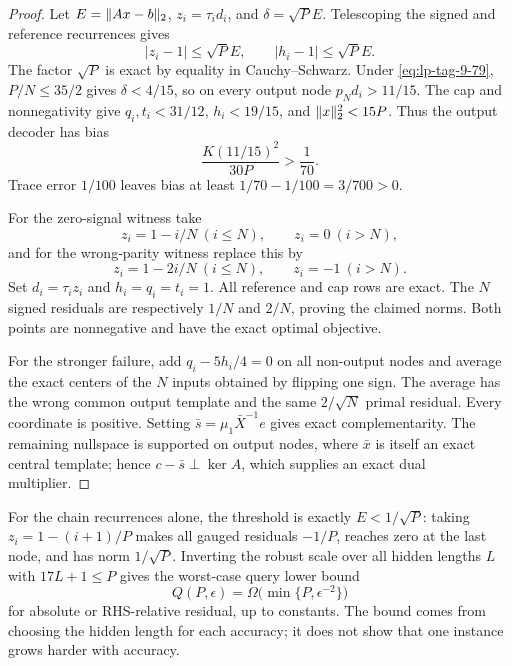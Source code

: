 \begin{proof}
Let \(E=\lVert Ax-b\rVert_2\), \(z_i=\tau_id_i\), and
\(\delta=\sqrt P E\).  Telescoping the signed and reference recurrences gives
\begin{equation}
 |z_i-1|\leq\sqrt P E,\qquad |h_i-1|\leq\sqrt P E.
\end{equation}
The factor \(\sqrt P\) is exact by equality in Cauchy--Schwarz.  Under
\eqref{eq:lp-tag-9-79}, \(P/N\leq35/2\) gives \(\delta<4/15\), so on every output node
\(p_Nd_i>11/15\).  The cap and nonnegativity give
\(q_i,t_i<31/12\), \(h_i<19/15\), and
\(\lVert x\rVert_2^2<15P\).  Thus the output decoder has bias
\begin{equation}
 \frac{K(11/15)^2}{30P}>\frac1{70}.
\end{equation}
Trace error \(1/100\) leaves bias at least
\(1/70-1/100=3/700>0\).

For the zero-signal witness take
\begin{equation}
 z_i=1-i/N\ (i\leq N),\qquad z_i=0\ (i>N),
\end{equation}
and for the wrong-parity witness replace this by
\begin{equation}
 z_i=1-2i/N\ (i\leq N),\qquad z_i=-1\ (i>N).
\end{equation}
Set \(d_i=\tau_i z_i\) and \(h_i=q_i=t_i=1\).  All reference and cap rows
are exact.  The \(N\) signed residuals are respectively \(1/N\) and
\(2/N\), proving the claimed norms.  Both points are nonnegative and have
the exact optimal objective.

For the stronger failure, add \(q_i-5h_i/4=0\) on all non-output nodes and
average the exact centers of the \(N\) inputs obtained by flipping one sign.
The average has the wrong common output template and the same
\(2/\sqrt N\) primal residual.  Every coordinate is positive.  Setting
\(\bar s=\mu_1\bar X^{-1}e\) gives exact complementarity.  The remaining
nullspace is supported on output nodes, where \(\bar x\) is itself an exact
central template; hence \(c-\bar s\perp\ker A\), which supplies an exact
dual multiplier.
\end{proof}

For the chain recurrences alone, the threshold is exactly
\(E<1/\sqrt P\): taking
\(z_i=1-(i+1)/P\) makes all gauged residuals \(-1/P\), reaches zero at the
last node, and has norm \(1/\sqrt P\).  Inverting the robust scale over all
hidden lengths \(L\) with \(17L+1\leq P\) gives the worst-case query lower
bound
\begin{equation}
 Q(P,\epsilon)=\Omega\bigl(\min\{P,\epsilon^{-2}\}\bigr)
\end{equation}
for absolute or RHS-relative residual, up to constants.  The bound comes
from choosing the hidden length for each accuracy; it does not show that one
instance grows harder with accuracy.

